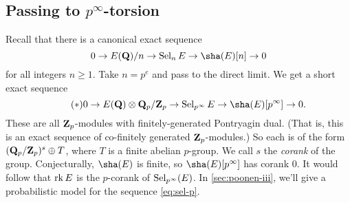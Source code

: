 \subsection{Passing to \texorpdfstring{$p^\infty$}{pinfty}-torsion}

Recall that there is a canonical exact sequence 
\[
  0 \to E(\dQ)/n \to \selmer_n E \to \sha(E)[n] \to 0 
\]
for all integers $n\geqslant 1$. Take $n=p^e$ and pass to the direct limit. We 
get a short exact sequence 
\begin{equation*}\tag{$\ast$}\label{eq:sel-p}
  0 \to E(\dQ)\otimes \dQ_p/\dZ_p \to \selmer_{p^\infty} E \to \sha(E)[p^\infty] \to 0 .
\end{equation*}
These are all $\mathbf{Z}_p$-modules with finitely-generated Pontryagin dual. (That 
is, this is an exact sequence of co-finitely generated $\mathbf{Z}_p$-modules.) So 
each is of the form $(\mathbf{Q}_p/\mathbf{Z}_p)^s\oplus T$, where $T$ is a finite abelian 
$p$-group. We call $s$ the \emph{corank} of the group. Conjecturally, 
$\sha(E)$ is finite, so $\sha(E)[p^\infty]$ has corank $0$. It would follow 
that $\operatorname{rk} E$ is the $p$-corank of $\operatorname{Sel}_{p^\infty}(E)$. In 
\autoref{sec:poonen-iii}, we'll give a probabilistic model for the sequence 
\eqref{eq:sel-p}. 




